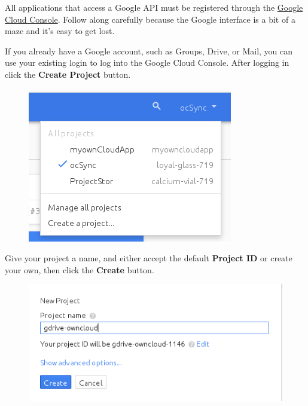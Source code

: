 \documentclass[letterpaper,10pt,english]{sphinxmanual}
\begin{document}
All applications that access a Google API must be registered through the
\href{https://console.developers.google.com/}{Google Cloud Console}. Follow along carefully
because the Google interface is a bit of a maze and it's easy to get lost.

If you already have a Google account, such as Groups, Drive, or Mail, you can
use your existing login to log into the Google Cloud Console. After logging in
click  the \textbf{Create Project} button.
\begin{figure}[htbp]
\centering

\includegraphics{google-drive.png}
\end{figure}

Give your project a name, and either accept the default \textbf{Project ID} or
create
your own, then click the \textbf{Create} button.
\begin{figure}[htbp]
\centering

\includegraphics{google-drive1.png}
\end{figure}
\end{document}

